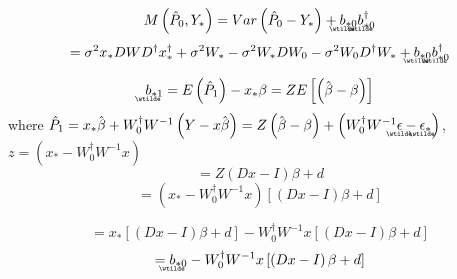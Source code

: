 \documentclass{article}
\begin{document}
\begin{equation*}
M\left( \hat{P}_{0},Y_{\ast }\right) =Var\left( \hat{P}_{0}-Y_{\ast }\right)
+%
\underaccent{\wtilde}{b}%
_{\ast 0}%
\underaccent{\wtilde}{b}%
_{\ast 0}^{\dagger }
\end{equation*}%
\begin{equation*}
=\sigma ^{2}x_{\ast }DWD^{\dagger }x_{\ast }^{\dagger }+\sigma ^{2}W_{\ast
}-\sigma ^{2}W_{\ast }DW_{0}-\sigma ^{2}W_{0}D^{\dagger }W_{\ast }+%
\underaccent{\wtilde}{b}%
_{\ast 0}%
\underaccent{\wtilde}{b}%
_{\ast 0}^{\dagger }
\end{equation*}

\bigskip

\begin{equation*}
\underaccent{\wtilde}{b}%
_{\ast 1}=E\left( \hat{P}_{1}\right) -x_{\ast }\beta =ZE\left[ \left( \hat{%
\beta}-\beta \right) \right]
\end{equation*}%
where $\hat{P}_{1}=x_{\ast }\hat{\beta}+W_{0}^{\dagger }W^{-1}\left( Y-x\hat{%
\beta}\right) =Z\left( \hat{\beta}-\beta \right) +\left( W_{0}^{\dagger
}W^{-1}%
\underaccent{\wtilde}{\epsilon}%
-%
\underaccent{\wtilde}{\epsilon}%
_{\ast }\right) $, $z=\left( x_{\ast }-W_{0}^{\dagger }W^{-1}x\right) $%
\begin{equation*}
=Z\left( Dx-I\right) \beta +d
\end{equation*}%
\begin{equation*}
=\left( x_{\ast }-W_{0}^{\dagger }W^{-1}x\right) \left[ \left( Dx-I\right)
\beta +d\right]
\end{equation*}

\begin{equation*}
=x_{\ast }\left[ \left( Dx-I\right) \beta +d\right] -W_{0}^{\dagger }W^{-1}x%
\left[ \left( Dx-I\right) \beta +d\right]
\end{equation*}%
\begin{equation*}
=%
\underaccent{\wtilde}{b}%
_{\ast 0}-W_{0}^{\dagger }W^{-1}x\left[ \left( Dx-I\right) \beta +d\right]
\end{equation*}
\end{document}
